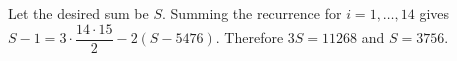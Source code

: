 Let the desired sum be $S$. Summing the recurrence for $i=1,\ldots,14$ gives $S-1=3\cdot\dfrac{14\cdot15}{2}-2(S-5476)$. Therefore $3S=11268$ and $\boxed{S=3756}$.
